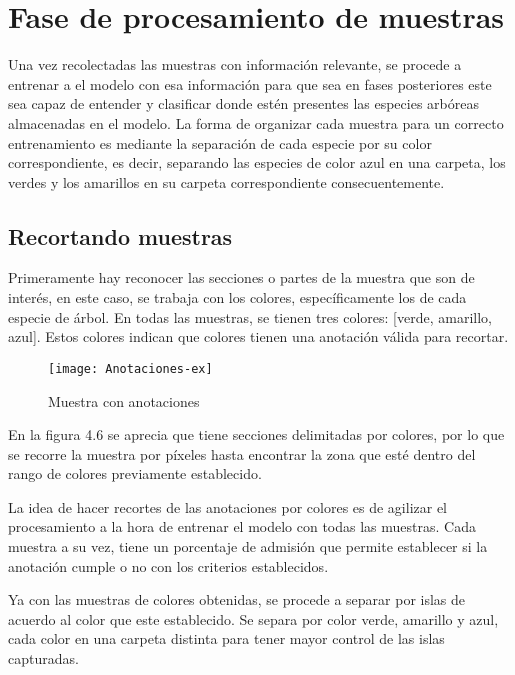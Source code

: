 \break

\section{Fase de procesamiento de muestras}
Una vez recolectadas las muestras con información relevante, se procede a  entrenar a el modelo con esa información para que sea en fases posteriores este sea capaz de entender y clasificar donde estén presentes las especies arbóreas almacenadas en el modelo. La forma de organizar cada muestra para un correcto entrenamiento es mediante la separación de cada especie por su color correspondiente, es decir, separando las especies de color azul en una carpeta, los verdes y los amarillos en su carpeta correspondiente consecuentemente.

\subsection{Recortando muestras}
Primeramente hay reconocer las secciones o partes de la muestra que son de interés, en este caso, se trabaja con los colores, específicamente los de cada especie de árbol. En todas las muestras, se tienen tres colores: [verde, amarillo, azul]. Estos colores indican que colores tienen una anotación válida para recortar.


\begin{figure}[H]
  \centering
  \begin{minipage}[b]{0.65\textwidth}
        \texttt{[image: Anotaciones-ex]}
    \caption{Muestra con anotaciones}
  \end{minipage}
\end{figure}
\clearpage

En la figura 4.6 se aprecia que tiene secciones delimitadas por colores, por lo que se recorre la muestra por píxeles hasta encontrar la zona que esté dentro del rango de colores previamente establecido.

La idea de hacer recortes de las anotaciones por colores es de agilizar el procesamiento a la hora de entrenar el modelo con todas las muestras. Cada muestra a su vez, tiene un porcentaje de admisión que permite establecer si la anotación cumple o no con los criterios establecidos.

Ya con las muestras de colores obtenidas, se procede a separar por islas de acuerdo al color que este establecido. Se separa por color verde, amarillo y azul, cada color en una carpeta distinta para tener mayor control de las islas capturadas.

